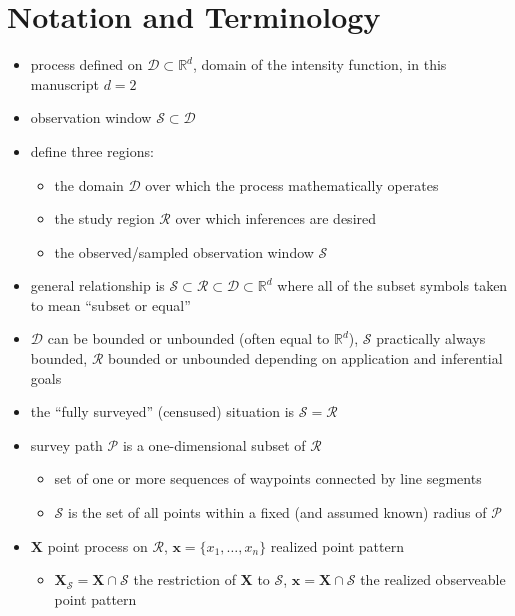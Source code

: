 \documentclass[review]{elsarticle}
\begin{document}
\appendix
\section{Notation and Terminology}

\begin{itemize}

\item process defined on \(\mathcal{D} \subset \mathbb{R}^{d}\), domain of the
intensity function, in this manuscript \(d = 2\)

\item observation window \(\mathcal{S} \subset \mathcal{D}\)

\item define three regions:
\begin{itemize}
\item the domain \(\mathcal{D}\) over which the process mathematically operates
\item the study region \(\mathcal{R}\) over which inferences are desired
\item the observed/sampled observation window \(\mathcal{S}\)
\end{itemize}

\item general relationship is \(\mathcal{S} \subset \mathcal{R}
\subset \mathcal{D} \subset \mathbb{R}^{d}\) where all of the subset symbols
taken to mean ``subset or equal''

\item \(\mathcal{D}\) can be bounded or unbounded (often equal to
\(\mathbb{R}^{d}\)), $\mathcal{S}$ practically always bounded, \(\mathcal{R}\)
bounded or unbounded depending on application and inferential goals

\item the ``fully surveyed'' (censused) situation is
\(\mathcal{S} = \mathcal{R}\)

\item survey path \(\mathcal{P}\) is a one-dimensional subset of
\(\mathcal{R}\)
\begin{itemize}
\item set of one or more sequences of waypoints connected by line segments
\item \(\mathcal{S}\) is the set of all points within a fixed (and assumed
known) radius of \(\mathcal{P}\)
\end{itemize}

\item \(\mathbf{X}\) point process on \(\mathcal{R}\), \(\mathbf{x} = \{x_{1},
\dots, x_{n}\}\) realized point pattern
\begin{itemize}
\item \(\mathbf{X}_{\mathcal{S}} = \mathbf{X} \cap \mathcal{S}\) the
 restriction of \(\mathbf{X}\) to \(\mathcal{S}\), \(\mathbf{x} = \mathbf{X}
\cap \mathcal{S}\) the realized observeable point pattern
\end{itemize}


\end{itemize}
\end{document}
